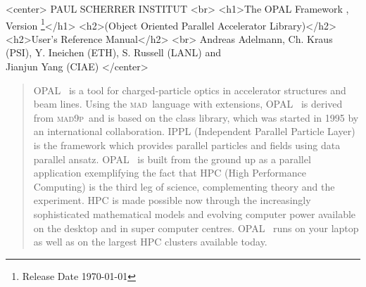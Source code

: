 \documentclass[12pt,a4paper]{report}
\newcommand{\opalversion}{\text{1.1.6}}
\newcommand{\mad}{\textsc{mad}}
\newcommand{\madninep}{\textsc{mad9p}}
\newcommand{\opal}{\textsc{OPAL} }
\begin{document}
\begin{titlepage}

\begin{htmlonly}
\begin{rawhtml}
<center>
PAUL SCHERRER INSTITUT
<br>
<h1>The OPAL Framework , Version \opalversion \footnote{Release Date \today}</h1>
<h2>(Object Oriented Parallel Accelerator Library)</h2>
<h2>User's Reference Manual</h2>
<br>
Andreas Adelmann, Ch. Kraus (PSI), Y. Ineichen (ETH), S. Russell (LANL) and \\ Jianjun Yang (CIAE)
</center>
\end{rawhtml}
\end{htmlonly}

\begin{quotation}
\opal\ is a tool for charged-particle optics in
accelerator structures and beam lines. 
Using the \mad\ language with extensions, \opal\ is derived from \madninep\ and is based 
on the
 class library,
which was started in 1995 by an international collaboration. IPPL (Independent Parallel Particle Layer) is
the framework which provides parallel particles and fields using data parallel ansatz. 
\opal\ is built from the ground up as a parallel application exemplifying the fact that HPC (High Performance Computing) 
is the third leg of science, complementing theory and the experiment. 
HPC is made possible now through the increasingly sophisticated mathematical models and evolving computer power available on the desktop
and in super computer centres. \opal\ runs on your laptop as well as on the largest HPC clusters available today.


\end{quotation}
\end{titlepage}
\end{document}
